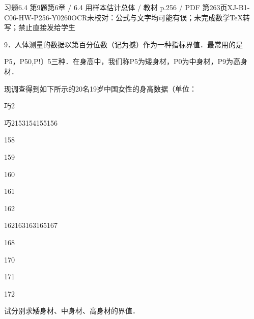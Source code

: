 \begin{bankitem}{习题6.4 第9题}{第6章 / 6.4 用样本估计总体 / 教材 p.256 / PDF 第263页}{XJ-B1-C06-HW-P256-Y0260}{OCR未校对：公式与文字均可能有误；未完成数学TeX转写；禁止直接发给学生}
\begin{ocrdraft}
\par
9．人体测量的数据以第百分位数（记为撼）作为一种指标界值．最常用的是
\par
P5，P50,P!〕5三种．在身高中，我们称P5为矮身材，P0为中身材，P9为高身材．
\par
现调查得到如下所示的20名19岁中国女性的身高数据（单位：
\par
巧2
\par
巧2153154155156
\par
158
\par
159
\par
160
\par
161
\par
162
\par
162163163165167
\par
168
\par
170
\par
171
\par
172
\par
试分别求矮身材、中身材、高身材的界值．
\end{ocrdraft}
\end{bankitem}
